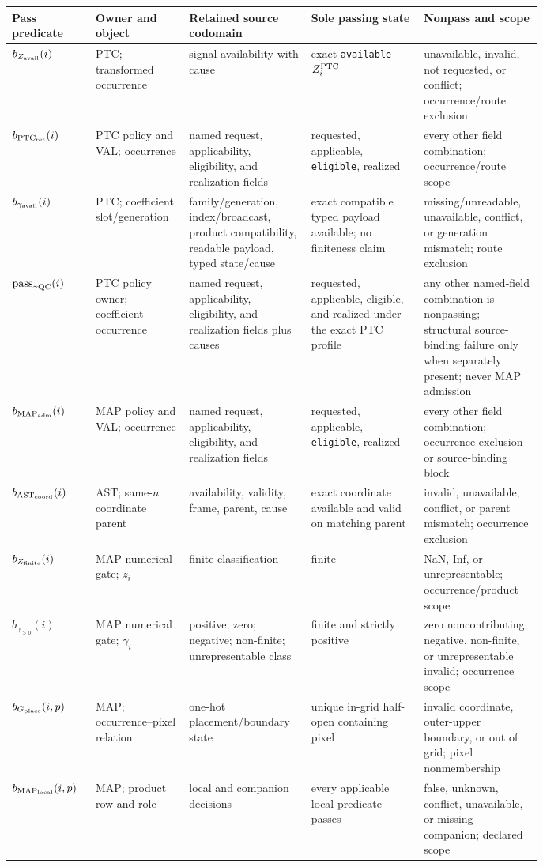 \documentclass[10pt]{article}
\newcommand{\code}[1]{\nolinkurl{#1}}
\begin{document}
{\footnotesize
\begin{longtable}{L{0.11\linewidth}L{0.15\linewidth}L{0.17\linewidth}L{0.19\linewidth}L{0.16\linewidth}}
\toprule
Pass predicate & Owner and object & Retained source codomain & Sole passing state & Nonpass and scope\\
\midrule
\(b_{Z_{\rm avail}}(i)\) & PTC; transformed occurrence & signal availability with cause & exact \code{available} \(Z_i^{\rm PTC}\) & unavailable, invalid, not requested, or conflict; occurrence/route exclusion\\
\(b_{{\rm PTC}_{\rm ret}}(i)\) & PTC policy and VAL; occurrence & named request, applicability, eligibility, and realization fields & requested, applicable, \code{eligible}, realized & every other field combination; occurrence/route scope\\
\(b_{\gamma_{\rm avail}}(i)\) & PTC; coefficient slot/generation & family/generation, index/broadcast, product compatibility, readable payload, typed state/cause & exact compatible typed payload available; no finiteness claim & missing/unreadable, unavailable, conflict, or generation mismatch; route exclusion\\
\(\mathrm{pass}_{\gamma{\rm QC}}(i)\) & PTC policy owner; coefficient occurrence & named request, applicability, eligibility, and realization fields plus causes & requested, applicable, eligible, and realized under the exact PTC profile & any other named-field combination is nonpassing; structural source-binding failure only when separately present; never MAP admission\\
\(b_{{\rm MAP}_{\rm adm}}(i)\) & MAP policy and VAL; occurrence & named request, applicability, eligibility, and realization fields & requested, applicable, \code{eligible}, realized & every other field combination; occurrence exclusion or source-binding block\\
\(b_{{\rm AST}_{\rm coord}}(i)\) & AST; same-\(n\) coordinate parent & availability, validity, frame, parent, cause & exact coordinate available and valid on matching parent & invalid, unavailable, conflict, or parent mismatch; occurrence exclusion\\
\(b_{Z_{\rm finite}}(i)\) & MAP numerical gate; \(z_i\) & finite classification & finite & NaN, Inf, or unrepresentable; occurrence/product scope\\
\(b_{\gamma_{>0}}(i)\) & MAP numerical gate; \(\gamma_i\) & positive; zero; negative; non-finite; unrepresentable class & finite and strictly positive & zero noncontributing; negative, non-finite, or unrepresentable invalid; occurrence scope\\
\(b_{G_{\rm place}}(i,p)\) & MAP; occurrence--pixel relation & one-hot placement/boundary state & unique in-grid half-open containing pixel & invalid coordinate, outer-upper boundary, or out of grid; pixel nonmembership\\
\(b_{{\rm MAP}_{\rm local}}(i,p)\) & MAP; product row and role & local and companion decisions & every applicable local predicate passes & false, unknown, conflict, unavailable, or missing companion; declared scope\\
\bottomrule
\end{longtable}
}
\end{document}
